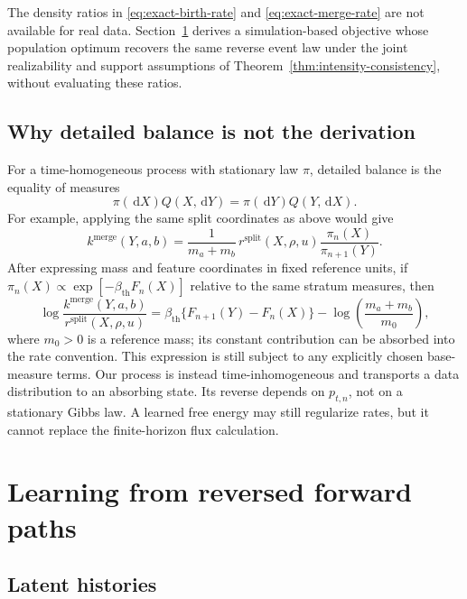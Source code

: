 \documentclass[10pt]{article}
\theoremstyle{definition}
\theoremstyle{remark}
\newcommand{\dd}{\,\mathrm{d}}
\begin{document}
The density ratios in \eqref{eq:exact-birth-rate} and
\eqref{eq:exact-merge-rate} are not available for real data.
Section~\ref{sec:learning} derives a simulation-based objective whose
population optimum recovers the same reverse event law under the joint
realizability and support assumptions of
Theorem~\ref{thm:intensity-consistency}, without evaluating these ratios.

\subsection{Why detailed balance is not the derivation}

For a time-homogeneous process with stationary law $\pi$, detailed balance is
the equality of measures
\begin{equation}
  \pi(\dd X)Q(X,\dd Y)=\pi(\dd Y)Q(Y,\dd X).
  \label{eq:detailed-balance}
\end{equation}
For example, applying the same split coordinates as above would give
\begin{equation}
  k^{\mathrm{merge}}(Y,a,b)
  =\frac{1}{m_a+m_b}\,
    r^{\mathrm{split}}(X,\rho,u)
    \frac{\pi_n(X)}{\pi_{n+1}(Y)}.
  \label{eq:stationary-merge-rate}
\end{equation}
After expressing mass and feature coordinates in fixed reference units, if
$\pi_n(X)\propto\exp[-\beta_{\mathrm{th}} F_n(X)]$ relative to the same stratum
measures, then
\begin{equation}
  \log\frac{k^{\mathrm{merge}}(Y,a,b)}
                 {r^{\mathrm{split}}(X,\rho,u)}
  =\beta_{\mathrm{th}}\{F_{n+1}(Y)-F_n(X)\}
   -\log\!\left(\frac{m_a+m_b}{m_0}\right),
  \label{eq:gibbs-rate-ratio}
\end{equation}
where $m_0>0$ is a reference mass; its constant contribution can be
absorbed into the rate convention.  This expression is still subject to
any explicitly chosen base-measure terms.  Our process is instead
time-inhomogeneous and transports a data distribution to an absorbing state.
Its reverse depends on $p_{t,n}$, not on a stationary Gibbs law.  A learned
free energy may still regularize rates, but it cannot replace the
finite-horizon flux calculation.

\section{Learning from reversed forward paths}
\label{sec:learning}

\subsection{Latent histories}
\end{document}
